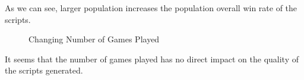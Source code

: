 \documentclass[]{article}
\begin{document}
As we can see, larger population increases the population overall win
rate of the scripts.

\begin{figure}[H]%
  \centering
  \qquad
  \qquad
  \caption{Changing Number of Games Played}%
  \label{fig:example}%
\end{figure}

It seems that the number of games played has no direct impact on the quality of the scripts generated.
\end{document}
